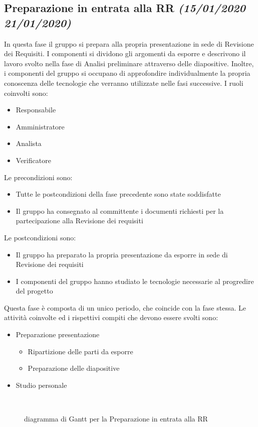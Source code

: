 \documentclass[../piano-di-progetto.tex]{subfiles}
\begin{document}
\subsection[Preparazione in entrata alla RR]{Preparazione in entrata alla RR {\normalsize\normalfont\itshape(15/01/2020  21/01/2020)}}%
\label{sub:preparazione_in_entrata_alla_rr}
In questa fase il gruppo si prepara alla propria presentazione in sede di Revisione dei Requisiti.
I componenti si dividono gli argomenti da esporre e descrivono il lavoro svolto nella fase di Analisi preliminare attraverso delle diapositive.
Inoltre, i componenti del gruppo si occupano di approfondire individualmente la propria conoscenza delle tecnologie che verranno utilizzate nelle fasi successive.
I ruoli coinvolti sono:
\begin{itemize}
  \item Responsabile
  \item Amministratore
  \item Analista
  \item Verificatore
\end{itemize}
Le precondizioni sono:
\begin{itemize}
  \item Tutte le postcondizioni della fase precedente sono state soddisfatte
  \item Il gruppo ha consegnato al committente i documenti richiesti per la partecipazione alla Revisione dei requisiti
\end{itemize}
Le postcondizioni sono:
\begin{itemize}
  \item Il gruppo ha preparato la propria presentazione da esporre in sede di Revisione dei requisiti
  \item I componenti del gruppo hanno studiato le tecnologie necessarie al progredire del progetto
\end{itemize}
Questa fase è composta di un unico periodo, che coincide con la fase stessa.
Le attività coinvolte ed i rispettivi compiti che devono essere svolti sono:
\begin{itemize}
  \item Preparazione presentazione
  \begin{itemize}
    \item Ripartizione delle parti da esporre
    \item Preparazione delle diapositive
  \end{itemize}
  \item Studio personale 
\end{itemize}
\begin{figure}[H]
  \centering
  
  \caption{diagramma di Gantt per la Preparazione in entrata alla RR}%
~~\label{fig:gantt_preparazione_rr}
\end{figure}
\end{document}
